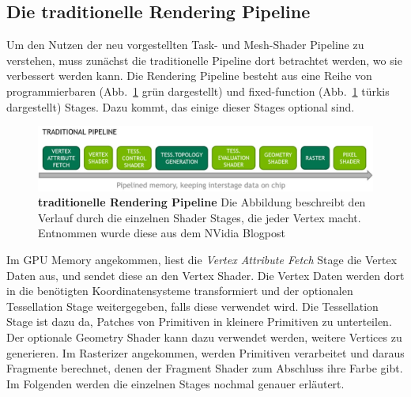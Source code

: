 \subsection{Die traditionelle Rendering Pipeline}
\label{subsec:traditionelle_renderingpipeline}
Um den Nutzen der neu vorgestellten Task- und Mesh-Shader Pipeline zu verstehen, muss zunächst die traditionelle Pipeline dort betrachtet werden, wo sie verbessert werden kann.
Die Rendering Pipeline besteht aus eine Reihe von programmierbaren (Abb.~\ref{fig:traditional_pipeline} grün dargestellt) und fixed-function (Abb.~\ref{fig:traditional_pipeline} türkis dargestellt) Stages.
Dazu kommt, das einige dieser Stages optional sind.
\begin{figure}[htb]
  \centering  
  \includegraphics[scale=0.43]{Bilder/traditionelle_pipeline.jpg}
  \caption[traditionelle Rendering Pipeline]{\textbf{traditionelle Rendering Pipeline} \newline Die Abbildung beschreibt den Verlauf durch die einzelnen Shader Stages, die jeder Vertex macht. Entnommen wurde diese aus dem NVidia Blogpost \cite{Kubisch2018}}
  \label{fig:traditional_pipeline}
\end{figure}
\newline
Im GPU Memory angekommen, liest die \textit{Vertex Attribute Fetch} Stage die Vertex Daten aus, und sendet diese an den Vertex Shader.
Die Vertex Daten werden dort in die benötigten Koordinatensysteme transformiert und der optionalen Tessellation Stage weitergegeben, falls diese verwendet wird.
Die Tessellation Stage ist dazu da, Patches von Primitiven in kleinere Primitiven zu unterteilen.
Der optionale Geometry Shader kann dazu verwendet werden, weitere Vertices zu generieren.
Im Rasterizer angekommen, werden Primitiven verarbeitet und daraus Fragmente berechnet, denen der Fragment Shader zum Abschluss ihre Farbe gibt. \newline
Im Folgenden werden die einzelnen Stages nochmal genauer erläutert.

